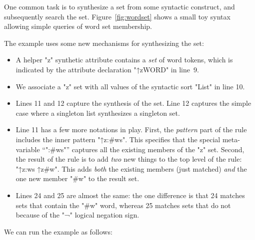 \documentclass[11pt]{article} %
\begin{document}
\begin{example}
  One common task is to synthesize a set from some syntactic construct, and subsequently search the
  set. Figure~\ref{fig:wordset} shows a small toy syntax allowing simple queries of word set
  membership.

  The example uses some new mechanisms for synthesizing the set:
  \begin{itemize}

  \item A helper "z" synthetic attribute contains a \emph{set} of word tokens, which is indicated by
    the attribute declaration "↑z{WORD}" in line~9.

  \item We associate a "z" set with all values of the syntactic sort "List" in line 10.

  \item Lines 11 and 12 capture the synthesis of the set. Line 12 captures the simple case where a
    singleton list synthesizes a singleton set.

  \item Line 11 has a few more notations in play.  First, the \emph{pattern} part of the rule
    includes the inner pattern "↑z{:#ws}". This specifies that the special meta-variable ``":#ws"''
    captures all the existing members of the "z" set.  Second, the result of the rule is to add
    \emph{two} new things to the top level of the rule: "↑z{:ws} ↑z{#w}". This adds \emph{both} the
    existing members (just matched) \emph{and} the one new member "#w" to the result set.

  \item Lines 24 and 25 are almost the same: the one difference is that 24 matches sets that contain
    the "#w" word, whereas 25 matches sets that do not because of the "¬" logical negation sign.
  \end{itemize}
  We can run the example as follows:
\end{example}
\end{document}
